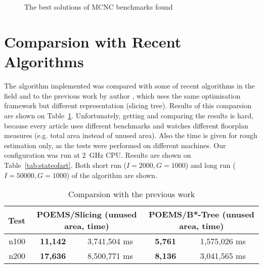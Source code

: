 \begin{figure}
\centering
{} \\
\subfloat[hp (3.9\% dead)]{\texttt{[image: hp]}} \\
 \hfill
{} \\
 \\
\caption{The best solutions of MCNC benchmarks found}
\label{fig:mcnc}
\end{figure}

\section{Comparsion with Recent Algorithms}

The algorithm implemented was compared with some of recent algorithms in the field and to the previous work by author \cite{vh}, which uses the same optimisation framework but different representation (slicing tree). Results of this comparsion are shown on Table~\ref{tab:bachelor}. Unfortunately, getting and comparing the results is hard, because every article uses different benchmarks and watches different floorplan measures (e.g. total area instead of unused area). Also the time is given for rough estimation only, as the tests were performed on different machines. Our configuration was run at 2~GHz CPU. Results are shown on Table~\ref{tab:stateofart}. Both short run ($I=2000,G=1000$) and long run ($I=50000,G=1000$) of the algorithm are shown.

\begin{table}
\centering
\begin{tabular}{|r|c|c|c|c|}
\hline
Test & \multicolumn{2}{|c|}{POEMS/Slicing (unused area, time)} & \multicolumn{2}{|c|}{POEMS/B*-Tree (unused area, time)} \\
\hline
\hline
n100 & {\bf 11,142} & 3,741,504 ms & {\bf 5,761} & 1,575,026 ms \\
\hline
n200 & {\bf 17,636} & 8,500,771 ms & {\bf 8,136} & 3,041,565 ms \\
\hline
\end{tabular}
\caption{Comparsion with the previous work}
\label{tab:bachelor}
\end{table}

